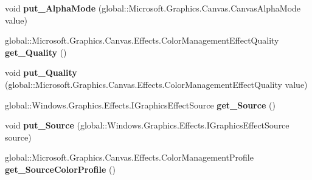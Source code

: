 \begin{DoxyCompactItemize}
void {\bfseries put\+\_\+\+Alpha\+Mode} (global\+::\+Microsoft.\+Graphics.\+Canvas.\+Canvas\+Alpha\+Mode value)
\item 
\mbox{\label{interface_microsoft_1_1_graphics_1_1_canvas_1_1_effects_1_1_i_color_management_effect_a89c6320a78dd9ee2ea791a82ba659f20}} 
global\+::\+Microsoft.\+Graphics.\+Canvas.\+Effects.\+Color\+Management\+Effect\+Quality {\bfseries get\+\_\+\+Quality} ()
\item 
\mbox{\label{interface_microsoft_1_1_graphics_1_1_canvas_1_1_effects_1_1_i_color_management_effect_a447e32036c75c68edbb85d92ede18c3b}} 
void {\bfseries put\+\_\+\+Quality} (global\+::\+Microsoft.\+Graphics.\+Canvas.\+Effects.\+Color\+Management\+Effect\+Quality value)
\item 
\mbox{\label{interface_microsoft_1_1_graphics_1_1_canvas_1_1_effects_1_1_i_color_management_effect_a836413a00b466fca673e824579e980b1}} 
global\+::\+Windows.\+Graphics.\+Effects.\+I\+Graphics\+Effect\+Source {\bfseries get\+\_\+\+Source} ()
\item 
\mbox{\label{interface_microsoft_1_1_graphics_1_1_canvas_1_1_effects_1_1_i_color_management_effect_a606468f964e7f248f59152b490d12d58}} 
void {\bfseries put\+\_\+\+Source} (global\+::\+Windows.\+Graphics.\+Effects.\+I\+Graphics\+Effect\+Source source)
\item 
\mbox{\label{interface_microsoft_1_1_graphics_1_1_canvas_1_1_effects_1_1_i_color_management_effect_ab5d6882071f30c0d22c6206687b4b83b}} 
global\+::\+Microsoft.\+Graphics.\+Canvas.\+Effects.\+Color\+Management\+Profile {\bfseries get\+\_\+\+Source\+Color\+Profile} ()
\item 
\mbox{\label{interface_microsoft_1_1_graphics_1_1_canvas_1_1_effects_1_1_i_color_management_effect_aa757b92037b6dabd9bf623a16c5dd4e6}} 

\end{DoxyCompactItemize}
